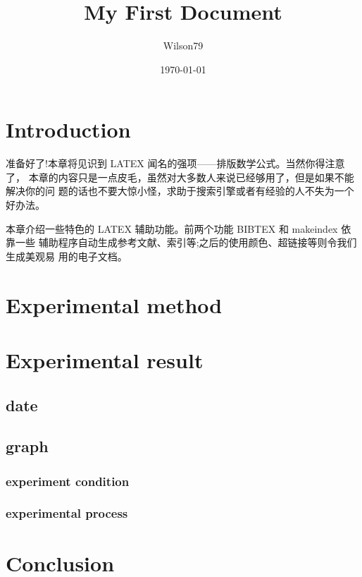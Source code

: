 \documentclass{article}
\title{My First Document}
\author{Wilson79}
\date{\today}
\begin{document}
 
    \tableofcontents %
	\maketitle %

	\section{Introduction} 
	准备好了!本章将见识到 LATEX 闻名的强项——排版数学公式。当然你得注意了， 本章的内容只是一点皮毛，虽然对大多数人来说已经够用了，但是如果不能解决你的问 题的话也不要大惊小怪，求助于搜索引擎或者有经验的人不失为一个好办法。
	
	本章介绍一些特色的 LATEX 辅助功能。前两个功能 BIBTEX 和 makeindex 依靠一些 辅助程序自动生成参考文献、索引等;之后的使用颜色、超链接等则令我们生成美观易 用的电子文档。 

	\section{Experimental method} %

	\section{Experimental result}
	\subsection{date} %
	\subsection{graph} %
	\subsubsection{experiment condition} %
	\subsubsection{experimental process} %

	\section{Conclusion}
\end{document}

